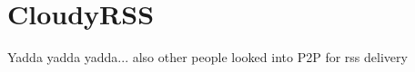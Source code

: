 \chapter{CloudyRSS}
Yadda yadda yadda... also other people looked into P2P for rss
delivery \cite{P2PFeedDelivery}
\cite{AttackResilientP2PFeedDissemination} \cite{SimpleSecurityP2PFeedDissemination}

